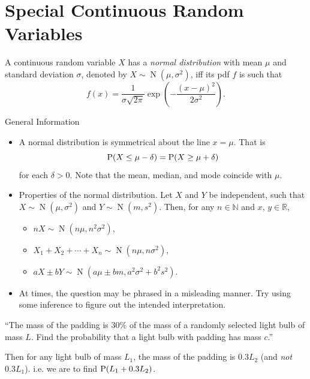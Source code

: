 \documentclass[../Notes.tex]{subfiles}
\begin{document}
\chapter{Special Continuous Random Variables}
\begin{definition}{}{}
  A continuous random variable \(X\) has a \emph{normal distribution} with mean \(\mu\) and standard deviation \(\sigma\), denoted by \(X \sim \operatorname{N}(\mu,\sigma^2)\), iff its pdf \(f\) is such that 
  \[f(x)=\frac{1}{\sigma\sqrt{2\pi}}\exp\left(-\frac{(x-\mu)^2}{2\sigma^2}\right).\]
\end{definition}
\begin{stbox}{General Information}
  \begin{itemize}
    \item A normal distribution is symmetrical about the line \(x=\mu\). That is 
    \[\operatorname{P}(X\leq\mu-\delta)=\operatorname{P}(X\geq\mu+\delta)\]
    for each \(\delta>0\). Note that the mean, median, and mode coincide with \(\mu\).
    \item Properties of the normal distribution. Let \(X\) and \(Y\) be independent, such that \(X \sim \operatorname{N}(\mu,\sigma^2)\) and \(Y \sim \operatorname{N}(m,s^2)\). Then, for any \(n \in \mathbb{N}\) and \(x\), \(y \in \mathbb{R}\),  
    \begin{itemize}
      \item \(nX \sim \operatorname{N}(n\mu,n^2\sigma^2)\),
      \item \(X_1+X_2+\cdots+X_n \sim \operatorname{N}(n\mu,n\sigma^2)\),
      \item \(aX\pm bY \sim \operatorname{N}(a\mu\pm bm,a^2\sigma^2+b^2s^2)\).
    \end{itemize}
    \item At times, the question may be phrased in a misleading manner. Try using some inference to figure out the intended interpretation.
  \end{itemize}
\end{stbox}
\begin{example}{}{}
  ``The mass of the padding is \(30\%\) of the mass of a randomly selected light bulb of mass \(L\). Find the probability that a light bulb with padding has mass \(c\).'' 
    
  Then for any light bulb of mass \(L_1\), the mass of the padding is \(0.3L_2\) (and \emph{not} \(0.3L_1\)). i.e. we are to find \(\operatorname{P}(L_1+0.3L_2)\).
\end{example}
\end{document}
